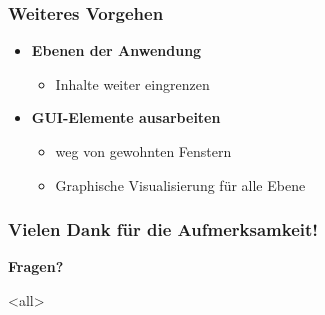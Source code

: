 \begin{frame}

\frametitle{Weiteres Vorgehen}
\label{weiteresvorgehen}

\begin{itemize}
\item \textbf{Ebenen der Anwendung}

\begin{itemize}
\item Inhalte weiter eingrenzen

\end{itemize}

\item \textbf{GUI-Elemente ausarbeiten}

\begin{itemize}
\item weg von gewohnten Fenstern

\item Graphische Visualisierung für alle Ebene

\end{itemize}

\end{itemize}

\end{frame}

\begin{frame}

\frametitle{Vielen Dank für die Aufmerksamkeit!}
\label{vielendankfrdieaufmerksamkeit}

\textbf{Fragen?}

\end{frame}

\mode<all>


\mode*

